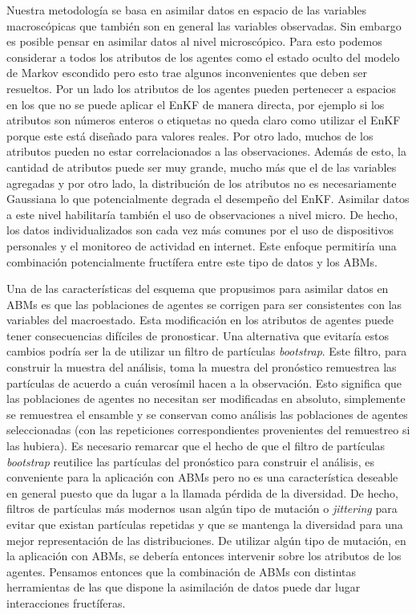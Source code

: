 Nuestra metodología se basa en asimilar datos en espacio de las variables macroscópicas que también son en general las variables observadas. Sin embargo es posible pensar en asimilar datos al nivel microscópico. Para esto podemos considerar a todos los atributos de los agentes como el estado oculto del modelo de Markov escondido pero esto trae algunos inconvenientes que deben ser resueltos. Por un lado los atributos de los agentes pueden pertenecer a espacios en los que no se puede aplicar el EnKF de manera directa, por ejemplo si los atributos son números enteros o etiquetas no queda claro como utilizar el EnKF porque este está diseñado para valores reales. Por otro lado, muchos de los atributos pueden no estar correlacionados a las observaciones. Además de esto, la cantidad de atributos puede ser muy grande, mucho más que el de las variables agregadas y por otro lado, la distribución de los atributos no es necesariamente Gaussiana lo que potencialmente degrada el desempeño del EnKF. Asimilar datos a este nivel habilitaría también el uso de observaciones a nivel micro. De hecho, los datos individualizados son cada vez más comunes por el uso de dispositivos personales y el monitoreo de actividad en internet. Este enfoque permitiría una combinación potencialmente fructífera entre este tipo de datos y los ABMs. 

Una de las características del esquema que propusimos para asimilar datos en ABMs es que las poblaciones de agentes se corrigen para ser consistentes con las variables del macroestado. Esta modificación en los atributos de agentes puede tener consecuencias difíciles de pronosticar. Una alternativa que evitaría estos cambios podría ser la de utilizar un filtro de partículas \textit{bootstrap}. Este filtro, para construir la muestra del análisis, toma la muestra del pronóstico remuestrea las partículas de acuerdo a cuán verosímil hacen a la observación. Esto significa que las poblaciones de agentes no necesitan ser modificadas en absoluto, simplemente se remuestrea el ensamble y se conservan como análisis las poblaciones de agentes seleccionadas (con las repeticiones correspondientes provenientes del remuestreo si las hubiera). Es necesario remarcar que el hecho de que el filtro de partículas \textit{bootstrap} reutilice las partículas del pronóstico para construir el análisis, es conveniente para la aplicación con ABMs pero no es una característica deseable en general puesto que da lugar a la llamada pérdida de la diversidad. De hecho, filtros de partículas más modernos usan algún tipo de mutación o \textit{jittering} para evitar que existan partículas repetidas y que se mantenga la diversidad para una mejor representación de las distribuciones. De utilizar algún tipo de mutación, en la aplicación con ABMs, se debería entonces intervenir sobre los atributos de los agentes. Pensamos entonces que la combinación de ABMs con distintas herramientas de las que dispone la asimilación de datos puede dar lugar interacciones fructíferas.

